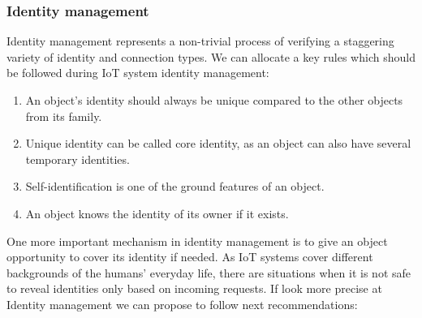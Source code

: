 \documentclass[12pt]{article}
\begin{document}
\subsubsection{Identity management} 
Identity management represents a non-trivial process of verifying a staggering variety of identity and connection types. We can allocate a key rules which should be followed during IoT system identity management:
  		\begin{enumerate}
 			 \item An object's identity should always be unique compared to the other objects from its family.
			 \item Unique identity can be called core identity, as an object can also have several temporary identities. 
			 \item  Self-identification is one of the ground features of an object.
			 \item An object knows the identity of its owner if it exists.
		\end{enumerate}
One more important mechanism in identity management is to give an object opportunity to cover its identity if needed.  As IoT systems cover different backgrounds of the humans' everyday life, there are situations when it is not safe to reveal identities only based on incoming requests. If look more precise at Identity management we can propose to follow next recommendations:
\end{document}
